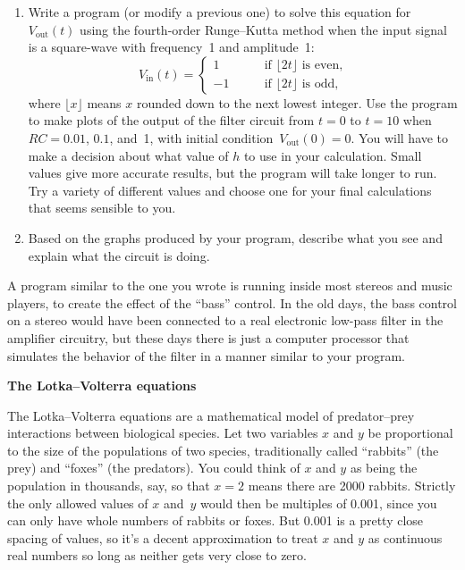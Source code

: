 \documentclass[12pt]{article}
\begin{document}
\begin{exercises}
\begin{enumerate}\setlength{\itemsep}{0pt}
\item Write a program (or modify a previous one) to solve this equation for
  $V_\textrm{out}(t)$ using the fourth-order Runge--Kutta method when the
  input signal is a square-wave with frequency~1 and amplitude~1:
\begin{equation}
V_\textrm{in}(t) = \begin{cases}
                     1  & \qquad\mbox{if $\lfloor 2t \rfloor$ is even,} \\
                     -1 & \qquad\mbox{if $\lfloor 2t \rfloor$ is odd,}
                   \end{cases}
\end{equation}
where $\lfloor x\rfloor$ means $x$ rounded down to the next lowest integer.
Use the program to make plots of the output of the filter circuit from
$t=0$ to $t=10$ when $RC=0.01$, $0.1$, and~1, with initial
condition~$V_\textrm{out}(0)=0$.  You will have to make a decision about
what value of $h$ to use in your calculation.  Small values give more
accurate results, but the program will take longer to run.  Try a variety
of different values and choose one for your final calculations that seems
sensible to you.
\item Based on the graphs produced by your program, describe what you see
  and explain what the circuit is doing.
\end{enumerate}

A program similar to the one you wrote is running inside most stereos and
music players, to create the effect of the ``bass'' control.  In the old
days, the bass control on a stereo would have been connected to a real
electronic low-pass filter in the amplifier circuitry, but these days there
is just a computer processor that simulates the behavior of the filter in a
manner similar to your program.



\exercise \textbf{The Lotka--Volterra equations}

\exskip The Lotka--Volterra equations are a
mathematical model of predator--prey interactions between biological
species.  Let two variables $x$ and $y$ be proportional to the size of the
populations of two species, traditionally called ``rabbits'' (the
prey) and ``foxes'' (the predators).  You could think of $x$ and $y$ as
being the population in thousands, say, so that $x=2$ means there are 2000
rabbits.  Strictly the only allowed values of $x$ and~$y$ would then be
multiples of 0.001, since you can only have whole numbers of rabbits or
foxes.  But 0.001 is a pretty close spacing of values, so it's a decent
approximation to treat $x$ and $y$ as continuous real numbers so long as
neither gets very close to zero.


\end{exercises}
\end{document}
